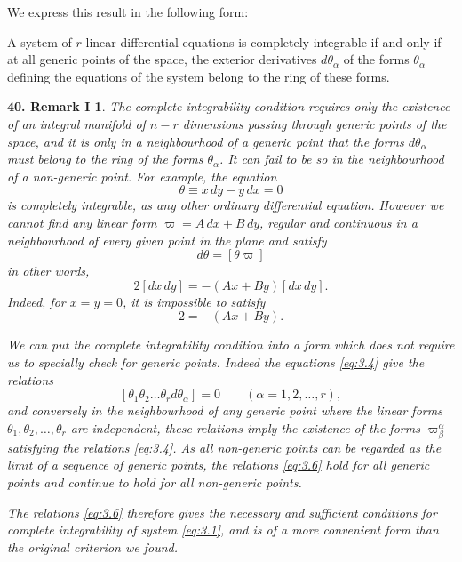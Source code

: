 We express this result in the following form:
\begin{thm*}
  A system of $r$ linear differential equations is completely integrable if and only if at all generic points of the space, the exterior derivatives $d\theta_{\alpha}$ of the forms $\theta_{\alpha}$ defining the equations of the system belong to the ring of these forms.
\end{thm*}


\vspace{12pt}\addtocounter{frenchsec}{1}
\theoremstyle{shape0}
\newtheorem*{rmk40}{\hspace{15pt}\textbf{40.} Remark I}
\begin{rmk40}
  The complete integrability condition requires only the existence of an integral manifold of $n-r$ dimensions passing through  \emph{generic} points of the space, and it is only in a neighbourhood of a generic point that the forms $d\theta_{\alpha}$ must belong to the ring of the forms $\theta_{\alpha}$. It can fail to be so in the neighbourhood of a non-generic point. For example, the equation
\[
\theta\equiv x\,dy-y\,dx=0
\]
is completely integrable, as any other ordinary differential equation. However we cannot find any linear form $\varpi=A\,dx+B\,dy$, regular and continuous in a neighbourhood of every given point in the plane and satisfy
\[
d\theta=[\theta\varpi]
\]
in other words,
\[
2[dx\,dy]=-(Ax+By)[dx\,dy].
\]
Indeed, for $x=y=0$, it is impossible to satisfy
\[
2=-(Ax+By).
\]
\begin{rmkii}
  We can put the complete integrability condition into a form which does not require us to specially check  for generic points. Indeed the equations \eqref{eq:3.4} give the relations
  \begin{equation}
    \label{eq:3.6}
    [\theta_{1}\theta_{2}\dots\theta_{r}d\theta_{\alpha}]=0\qquad(\alpha=1,2,\dots,r),
  \end{equation}
and conversely in the neighbourhood of any generic point where the linear forms $\theta_{1},\theta_{2},\dots,\theta_{r}$ are independent, these relations imply the existence of the forms $\varpi^{\alpha}_{\beta}$ satisfying the relations \eqref{eq:3.4}. As all non-generic points can be regarded as the limit of a sequence of generic points, the relations \eqref{eq:3.6} hold for all generic points and continue to hold for all non-generic points.

\emph{The relations \eqref{eq:3.6} therefore gives the necessary and sufficient conditions for complete integrability of system \eqref{eq:3.1}}, and is of a more convenient form than the original criterion  we  found.
\end{rmkii}


\end{rmk40}
